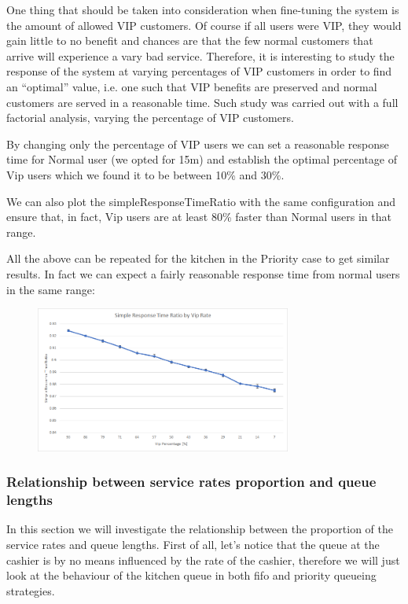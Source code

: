 One thing that should be taken into consideration when fine-tuning the system is the amount of allowed VIP customers. Of course if all users were VIP, they would gain little to no benefit and chances are that the few normal customers that arrive will experience a vary bad service. Therefore, it is interesting to study the response of the system at varying percentages of VIP customers in order to find an ``optimal'' value, i.e. one such that VIP benefits are preserved and normal customers are served in a reasonable time. Such study was carried out with a full factorial analysis, varying the percentage of VIP customers.

By changing only the percentage of VIP users we can set a reasonable response time for Normal user (we opted for 15m) and establish the optimal percentage of Vip users which we found it to be between 10\% and 30\%.

We can also plot the simpleResponseTimeRatio with the same configuration and ensure that, in fact, Vip users are at least 80\% faster than Normal users in that range.

All the above can be repeated for the kitchen in the Priority case to get similar results. In fact we can expect a fairly reasonable response time from normal users in the same range:

\begin{figure}[H]
    \centering
    \includegraphics[width=0.75\textwidth]{figs/simpleResponseTimeRatio.png} %
\end{figure}

\subsubsection{Relationship between service rates proportion and queue lengths}
\label{sec:cashier_no_infl}

In this section we will investigate the relationship between the proportion of the service rates and queue lengths. First of all, let's notice that the queue at the cashier is by no means influenced by the rate of the cashier, therefore we will just look at the behaviour of the kitchen queue in both fifo and priority queueing strategies.

